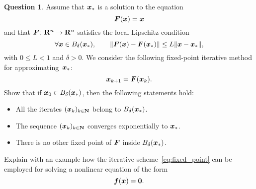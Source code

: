 \documentclass[11pt]{article}
\theoremstyle{definition}
\newtheorem{question}{Question}
\begin{document}
\newpage
\begin{question}
    Assume that $\mathbf{\boldsymbol{x}}_*$ is a solution to the equation
    \[
        \mathbf{\boldsymbol{F}}(\mathbf{\boldsymbol{x}}) = \mathbf{\boldsymbol{x}}
    \]
    and that $\mathbf{\boldsymbol{F}}\colon \mathbf R^n \to \mathbf R^n$ satisfies the local Lipschitz condition
    \begin{equation}
        \label{eq:local_lipschitz}
        \forall \vect x \in B_{\delta}(\vect x_*), \qquad
        \norm[big]{\vect F(\vect x) - \vect F(\vect x_*)} \leq L \norm{\vect x - \vect x_*},
    \end{equation}
    with $0 \leq L < 1$ and $\delta > 0$.
    We consider the following fixed-point iterative method for approximating~$\mathbf{\boldsymbol{x}}_*$:
    \begin{equation}
        \label{eq:fixed_point}
        \mathbf{\boldsymbol{x}}_{k+1} = \mathbf{\boldsymbol{F}}(\mathbf{\boldsymbol{x}}_k).
    \end{equation}
    Show that if $\mathbf{\boldsymbol{x}}_0 \in B_{\delta}(\mathbf{\boldsymbol{x}}_*)$,
    then the following statements hold:
    \begin{itemize}
        \item All the iterates $(\mathbf{\boldsymbol{x}}_k)_{k \in \mathbf N}$ belong to $B_{\delta}(\mathbf{\boldsymbol{x}}_*)$.
        \item The sequence $(\mathbf{\boldsymbol{x}}_k)_{k \in \mathbf N}$ converges exponentially to $\mathbf{\boldsymbol{x}}_*$.
        \item There is no other fixed point of $\mathbf{\boldsymbol{F}}$ inside $B_{\delta}(\mathbf{\boldsymbol{x}}_*)$.
    \end{itemize}
    Explain with an example how the iterative scheme~\eqref{eq:fixed_point} can be employed for solving a nonlinear equation of the form
    \[
        \mathbf{\boldsymbol{f}}(\mathbf{\boldsymbol{x}}) = \mathbf{\boldsymbol{0}}.
    \]
\end{question}

\end{document}
